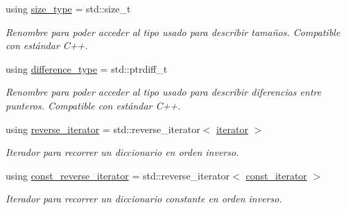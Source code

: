 \begin{DoxyCompactItemize}
using \hyperlink{classaed2_1_1iterator_a0d460d3f76439cea3436e1113990be47}{size\+\_\+type} = std\+::size\+\_\+t
\begin{DoxyCompactList}\small\item\em Renombre para poder acceder al tipo usado para describir tamaños. Compatible con estándar C++. \end{DoxyCompactList}\item 
\mbox{\label{classaed2_1_1iterator_a552af1cab9391f5af6bb86d457031329}} 
using \hyperlink{classaed2_1_1iterator_a552af1cab9391f5af6bb86d457031329}{difference\+\_\+type} = std\+::ptrdiff\+\_\+t
\begin{DoxyCompactList}\small\item\em Renombre para poder acceder al tipo usado para describir diferencias entre punteros. Compatible con estándar C++. \end{DoxyCompactList}\item 
using \hyperlink{classaed2_1_1iterator_a07b2c0fa31611e03cd019b290acd6d80}{reverse\+\_\+iterator} = std\+::reverse\+\_\+iterator$<$ \hyperlink{classaed2_1_1iterator_1_1iterator}{iterator} $>$
\begin{DoxyCompactList}\small\item\em Iterador para recorrer un diccionario en orden inverso. \end{DoxyCompactList}\item 
using \hyperlink{classaed2_1_1iterator_a657402896e5b5966660032f5686cc4c4}{const\+\_\+reverse\+\_\+iterator} = std\+::reverse\+\_\+iterator$<$ \hyperlink{classaed2_1_1iterator_1_1const__iterator}{const\+\_\+iterator} $>$
\begin{DoxyCompactList}\small\item\em Iterador para recorrer un diccionario constante en orden inverso. \end{DoxyCompactList}\end{DoxyCompactItemize}
